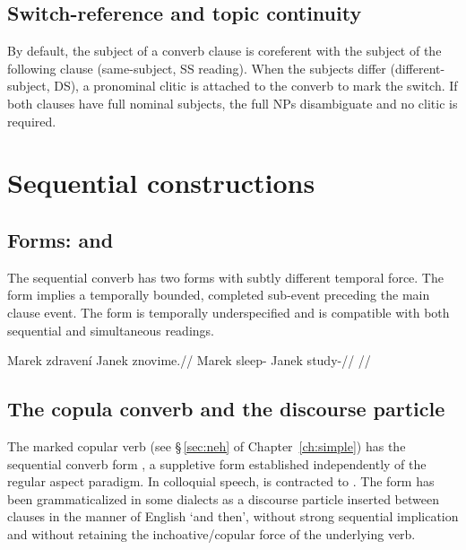 \subsection{Switch-reference and topic continuity}\label{sec:switch-reference}

By default, the subject of a converb clause is coreferent with the subject of the following clause (same-subject, SS reading). When the subjects differ (different-subject, DS), a pronominal clitic is attached to the converb to mark the switch. If both clauses have full nominal subjects, the full NPs disambiguate and no clitic is required.

\section{Sequential constructions}\label{sec:sequential}

\subsection{Forms:  and }

The sequential converb has two forms with subtly different temporal force. The  form implies a temporally bounded, completed sub-event preceding the main clause event. The  form is temporally underspecified and is compatible with both sequential and simultaneous readings.

\pex
\a
\begingl
\gla Marek zdravení Janek znovime.//
\glb Marek sleep-\Seq{} Janek study-\Prog{}//
\glft {} //
\endgl
\xe

\subsection{The copula converb and the discourse particle }\label{sec:seq-copula}

The marked copular verb  (see §\,\ref{sec:neh} of Chapter~\ref{ch:simple}) has the sequential converb form , a suppletive form established independently of the regular aspect paradigm. In colloquial speech,  is contracted to . The form  has been grammaticalized in some dialects as a discourse particle inserted between clauses in the manner of English `and then', without strong sequential implication and without retaining the inchoative/copular force of the underlying verb.

